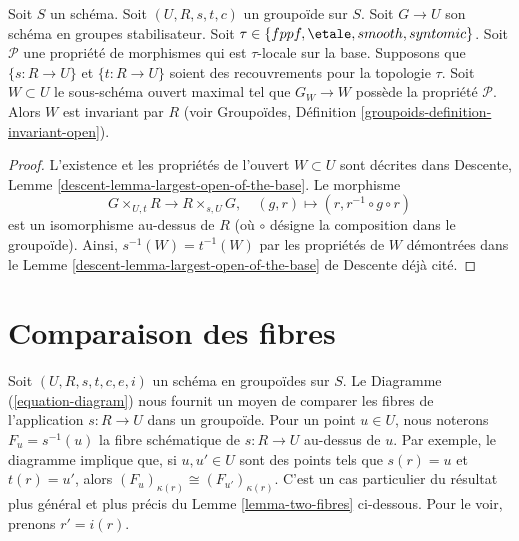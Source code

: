 \begin{lemma}
\label{lemma-property-G-invariant}
Soit $S$ un schéma.
Soit $(U, R, s, t, c)$ un groupoïde sur $S$.
Soit $G \to U$ son schéma en groupes stabilisateur.
Soit $\tau \in \{fppf, \linebreak[0] \etale, \linebreak[0]
smooth, \linebreak[0] syntomic\}$.
Soit $\mathcal{P}$ une propriété de morphismes qui est $\tau$-locale
sur la base. Supposons que $\{s : R \to U\}$ et $\{t : R \to U\}$ soient des recouvrements
pour la topologie $\tau$. Soit $W \subset U$ le sous-schéma ouvert maximal
tel que $G_W \to W$ possède la propriété $\mathcal{P}$. Alors $W$ est invariant par $R$
(voir
Groupoïdes, Définition
\ref{groupoids-definition-invariant-open}).
\end{lemma}

\begin{proof}
L'existence et les propriétés de l'ouvert $W \subset U$ sont décrites dans
Descente, Lemme \ref{descent-lemma-largest-open-of-the-base}.
Le morphisme
$$
G \times_{U, t} R \longrightarrow R \times_{s, U} G, \quad
(g, r) \longmapsto (r, r^{-1} \circ g \circ r)
$$
est un isomorphisme au-dessus de $R$ (où $\circ$ désigne
la composition dans le groupoïde). Ainsi, $s^{-1}(W) = t^{-1}(W)$ par les
propriétés de $W$ démontrées dans le
Lemme \ref{descent-lemma-largest-open-of-the-base} de Descente déjà cité.
\end{proof}



\section{Comparaison des fibres}
\label{section-fibres}

\noindent
Soit $(U, R, s, t, c, e, i)$ un schéma en groupoïdes sur $S$.
Le Diagramme (\ref{equation-diagram})
nous fournit un moyen de comparer les fibres de l'application $s : R \to U$ dans un groupoïde.
Pour un point $u \in U$, nous noterons $F_u = s^{-1}(u)$ la fibre
schématique de $s : R \to U$ au-dessus de $u$. Par exemple, le diagramme
implique que, si $u, u' \in U$ sont des points tels
que $s(r) = u$ et $t(r) = u'$, alors
$(F_u)_{\kappa(r)} \cong (F_{u'})_{\kappa(r)}$.
C'est un cas particulier du résultat plus général et plus précis du
Lemme \ref{lemma-two-fibres}
ci-dessous. Pour le voir, prenons $r' = i(r)$.

